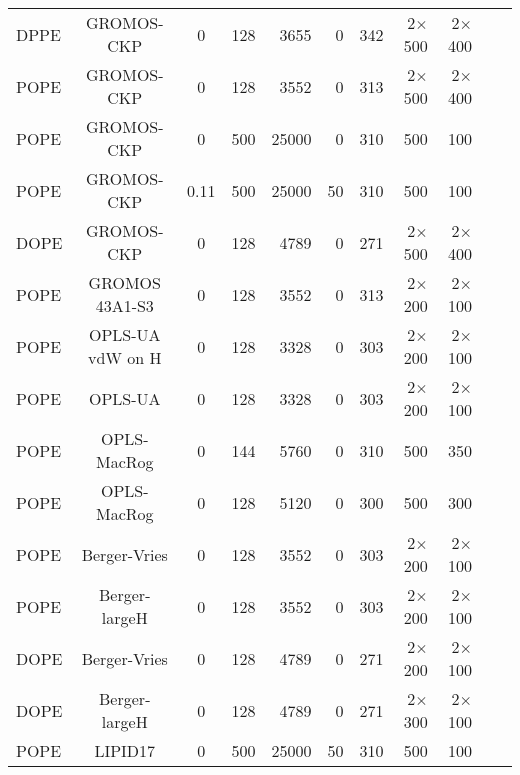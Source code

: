 \documentclass[aps,prl,superscriptaddress,twocolumn]{revtex4}
\begin{document}
\begin{table*}[htb]
\begin{minipage}[t]{\textwidth}
\begin{tabular}{l c c r r r r r r c c}
      \hline
      DPPE  & GROMOS-CKP    \cite{??}      &0    & 128	& 3655  &0    & 342  & 2$\times$500 & 2$\times$400 & \cite{gromosCKPdppe} \\
      POPE  & GROMOS-CKP    \cite{??}      &0    & 128	& 3552  &0    & 313  & 2$\times$500 & 2$\times$400 & \cite{gromosCKPpope} \\
      POPE  & GROMOS-CKP    \cite{??}      &0    & 500	& 25000 &0    & 310  & 500 & 100 & \cite{gromosCKPpopeT310} \\
      POPE  & GROMOS-CKP    \cite{??}      &0.11 & 500	& 25000 &50   & 310  & 500 & 100 & \cite{gromosCKPpopeT310150mMNaCl} \\
      DOPE  & GROMOS-CKP    \cite{??}      &0    & 128	& 4789  &0    & 271  & 2$\times$500 & 2$\times$400 & \cite{gromosCKPdope} \\
      \hline
      POPE  & GROMOS 43A1-S3 \cite{??}     &0    & 128	& 3552     &0    & 313  & 2$\times$200 & 2$\times$100 & \cite{gromos43a1s3POPEfiles}  \\
      \hline
      POPE  & OPLS-UA vdW on H \cite{??}   &0    & 128	& 3328     &0    & 303  & 2$\times$200 & 2$\times$100 & \cite{OPLSuaWvdWPOPEfiles} \\
      POPE  & OPLS-UA \cite{??}            &0    & 128	& 3328     &0    & 303  & 2$\times$200 & 2$\times$100 & \cite{OPLSuaPOPEfiles} \\
      \hline
      POPE  & OPLS-MacRog \cite{rog16}     &0    & 144	& 5760     &0    & 310  & 500 & 350 & \cite{MacRogPOPEfiles} \\
      POPE  & OPLS-MacRog \cite{rog16}     &0    & 128	& 5120     &0    & 300  & 500 & 300 & \cite{MacRogPOPEfilesT300K} \\
      \hline
      POPE  & Berger-Vries \cite{??}       &0    & 128	& 3552  &0    & 303  & 2$\times$200 & 2$\times$100 & \cite{bergerPOPEfiles}  \\
      POPE  & Berger-largeH \cite{??}      &0    & 128	& 3552  &0    & 303  & 2$\times$200 & 2$\times$100 & \cite{berger2POPEfiles}  \\
      DOPE  & Berger-Vries \cite{??}       &0    & 128	& 4789  &0    & 271  & 2$\times$200 & 2$\times$100 & \cite{bergerDOPEfiles}  \\
      DOPE  & Berger-largeH \cite{??}      &0    & 128	& 4789  &0    & 271  & 2$\times$300 & 2$\times$100 & \cite{berger2DOPEfiles} \\ 
      \hline
      POPE             & LIPID17 \cite{gould18} & 0      & 500 & 25000 & 50  &  310  & 500 & 100 & \cite{POPElipid17} \\

\end{tabular}
\end{minipage}
\end{table*}
\end{document}
